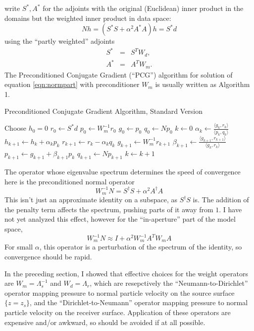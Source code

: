 write $S^*, A^*$ for the adjoints with the original (Euclidean) inner product in the domains but the weighted inner product in data space:
\begin{equation}
  \label{eqn:normpart}
  Nh = (S^*S + \alpha^2 A^*A)h = S^*d 
\end{equation}
using the ``partly weighted'' adjoints
\begin{eqnarray}
  \label{eqn:sadj}
  S^* &=& S^T W_d,\\
  A^* &=& A^T W_m.
\end{eqnarray}
The Preconditioned Conjugate Gradient (``PCG'') algorithm for solution of equation \ref{eqn:normpart} with preconditioner $W_m$ is usually written as Algorithm 1.

\begin{algorithm}[H]
\caption{Preconditioned Conjugate Gradient Algorithm, Standard Version}
\begin{algorithmic}[1]
\State Choose $h_0=0$ 
  \State $r_0 \gets S^*d$
  \State $p_0 \gets W_m^{-1}r_0$
  \State $g_0 \gets p_0$
  \State $q_0 \gets Np_0$
  \State $k \gets 0$
  \Repeat
  \State $\alpha_k \gets \frac{\langle g_k,r_k \rangle}{\langle p_k,q_k\rangle}$
  \State $h_{k+1} \gets h_k + \alpha_k p_k$
  \State $r_{k+1} \gets r_k - \alpha_kq_k$
  \State $g_{k+1} \gets W_m^{-1}r_{k+1}$
  \State $\beta_{k+1} \gets \frac{\langle g_{k+1},r_{k+1}\rangle}{\langle g_k,r_k\rangle}$
  \State $p_{k+1}\gets g_{k+1}+\beta_{k+1}p_k$
  \State $q_{k+1} \gets Np_{k+1}$
  \State $k \gets k+1$
\end{algorithmic}
\end{algorithm}

The operator whose eigenvalue spectrum determines the speed of convergence here is the preconditioned normal operator
\begin{equation}
  \label{eqn:pno}
  W_m^{-1}N = S^{\dagger}S +\alpha^2 A^{\dagger}A
\end{equation}
This isn't just an approximate identity on a subspace, as $S^{\dagger}S$ is. The addition of the penalty term affects the spectrum, pushing parts of it away from $1$. I have not yet analyzed this effect, however for the ``in-aperture'' part of the model space,
\[
  W_m^{-1}N \approx I +\alpha^2 W_m^{-1}A^TW_mA
\]
For small $\alpha$, this operator is a perturbation of the spectrum of the identity, so convergence should be rapid. 

In the preceding section, I showed that effective choices for the weight operators are $W_m = \Lambda_s^{-1}$ and $W_d = \Lambda_r$, which are resepctively the ``Neumann-to-Dirichlet'' operator mapping pressure to normal particle velocity on the source surface $\{z=z_s\}$, and the ``Dirichlet-to-Neumann'' operator mapping pressure to normal particle velocity on the receiver surface. Application of these operators are expensive and/or awkward, so should be avoided if at all possible. 

